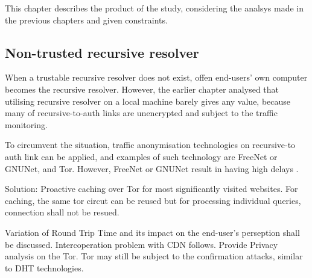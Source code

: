 This chapter describes the product of the study, considering the analsys made in the previous chapters and given constraints.

\subsection{Non-trusted recursive resolver}
When a trustable recursive resolver does not exist, offen end-users' own computer becomes the recursive resolver. However, the earlier chapter analysed that utilising recursive resolver on a local machine barely gives any value, because many of recursive-to-auth links are unencrypted and subject to the traffic monitoring.

To circumvent the situation, traffic anonymisation technologies on recursive-to auth link can be applied, and examples of such technology are  FreeNet \cite{clarke2001freenet} or GNUNet\cite{grothoff2017gnunet}, and Tor.
However, FreeNet \cite{clarke2001freenet} or GNUNet \cite{grothoff2017gnunet} result in having high delays \cite{anonymousoverdns}.

Solution: Proactive caching \cite{cohen2003proactive} over Tor for most significantly visited websites. For caching, the same tor circut can be reused but for processing individual queries, connection shall not be resued.

Variation of Round Trip Time and its impact on the end-user's perseption shall be discussed. Intercoperation problem with CDN follows.
Provide Privacy analysis on the Tor. Tor may still be subject to the confirmation attacks, similar to DHT technologies. 
